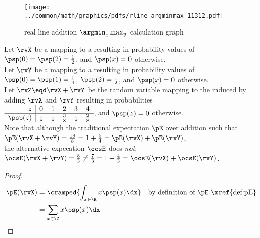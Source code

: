 \begin{tabstr}{0.75}
\begin{figure}[h]
  \gsize%
  \centering%
  {\texttt{[image: ../common/math/graphics/pdfs/rline\_argminmax\_11312.pdf]}}%
  \caption{real line addition $\argmin_x\max_y$ calculation graph \label{fig:rline_11312}}
\end{figure}
\begin{example}
\label{ex:rline_11312}
Let $\rvX$ be a   mapping to 
a    resulting in probability values of 
\\\indentx$\psp(0)=\psp(2)=\frac{1}{2}$, and $\psp(x)=0$ otherwise.\\
Let $\rvY$ be a  mapping to 
a   resulting in probability values of 
\\\indentx$\psp(0)=\psp(1)=\frac{1}{4}$, $\psp(2)=\frac{1}{2}$, and $\psp(x)=0$ otherwise.\\
Let $\rvZ\eqd\rvX+\rvY$ be the random variable mapping to the   induced by 
adding $\rvX$ and $\rvY$ resulting in probabilities 
\\\indentx$\begin{array}{r|ccccc}
  z      & 0 & 1 & 2 & 3 & 4 
  \\\hline
 \psp(z) & \frac{1}{8} & \frac{1}{8} & \frac{3}{8} & \frac{1}{8} & \frac{2}{8}  
\end{array}$, and $\psp(z)=0$ otherwise.
\\
Note that although the traditional expectation $\pE$   over addition such that
\\\indentx$\pE(\rvX+\rvY) = \frac{18}{8} = 1 + \frac{5}{4} = \pE(\rvX) + \pE(\rvY)$,\\
the alternative expecation $\ocsE$  does \emph{not}:
\\\indentx$\ocsE(\rvX+\rvY) = \frac{8}{3} \neq \frac{7}{3} =  1 + \frac{4}{3} = \ocsE(\rvX) + \ocsE(\rvY)$.
\end{example}
\begin{proof}
    \begin{align*}
      \pE(\rvX)
        &= \cramped{\int_{x\in\R} x\psp(x) \dx}
        && \text{by definition of $\pE$ \xref{def:pE}}
      \\&= \sum_{x\in\Z} x\psp(x) \dx

\end{align*}
\end{proof}
\end{tabstr}
